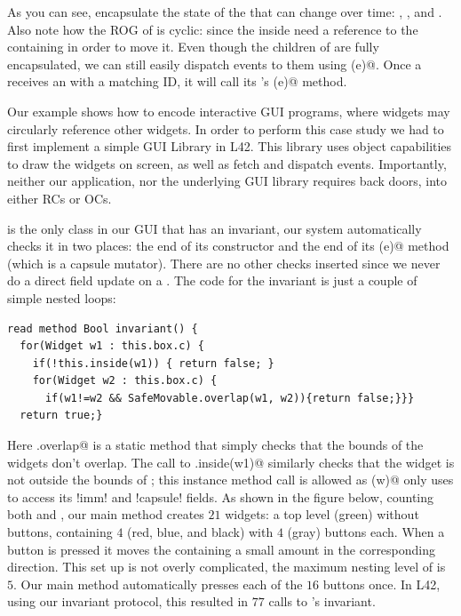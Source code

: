 As you can see, \Q@Box@es encapsulate the state of the \Q@SafeMovable@s that can change over time:
\Q@left@, \Q@top@, and \Q@children@. Also note how the ROG of \Q@Box@ is cyclic: since
the \Q@MoveAction@s inside \Q@Button@s need a reference to the containing \Q@Box@ in order to move it.
Even though the children of \Q@SafeMovable@s are fully encapsulated, we can still easily dispatch events to them using \Q@dispatch(e)@. Once a \Q@Button@ receives an \Q@Event@ with a matching ID, it will call its \Q@Action@'s \Q@process(e)@ method. 

Our example shows how to encode interactive GUI programs, where widgets may circularly reference other widgets.
In order to perform this case study we had to first implement a simple GUI Library in L42. This library uses object capabilities to draw the widgets on screen, as well as fetch and dispatch events. Importantly, neither our application, nor the underlying GUI library requires back doors, into either RCs or OCs.

\Q@SafeMovable@ is the only class in our GUI that has an invariant, our system automatically checks it in two places: the end of its constructor and the end of its \Q@dispatch(e)@ method (which is a capsule mutator). There are no other checks inserted since we never do a direct field update on a \Q@SafeMovable@. The code for the invariant is just a couple of simple nested loops:
\begin{lstlisting}
read method Bool invariant() {
  for(Widget w1 : this.box.c) {
    if(!this.inside(w1)) { return false; }
    for(Widget w2 : this.box.c) {
      if(w1!=w2 && SafeMovable.overlap(w1, w2)){return false;}}}
  return true;}
\end{lstlisting}

Here \Q@SafeMovable.overlap@ is a static method that simply checks that the bounds of the widgets don't overlap. The call to \Q@this.inside(w1)@ similarly checks that the widget is not outside the bounds of \Q@this@; this instance method call is allowed as \Q@inside(w)@ only uses \Q@this@ to access its \Q!imm! and \Q!capsule! fields.
As shown in the figure below, counting both \Q@SafeMovable@s and \Q@Button@s, our main method creates $21$ widgets: a top level (green) \Q@SafeMovable@ without buttons, containing $4$ (red, blue, and black) \Q@SafeMovable@s with
$4$ (gray) buttons each. When a button is pressed it moves the containing \Q@SafeMovable@ a small amount in the corresponding direction.
This set up is not overly complicated, the maximum nesting level of \Q@Widget@s is $5$.
Our main method automatically presses each of the $16$ buttons once. In L42, using our invariant protocol, this resulted in $77$ calls to \Q@SafeMovable@'s invariant.


